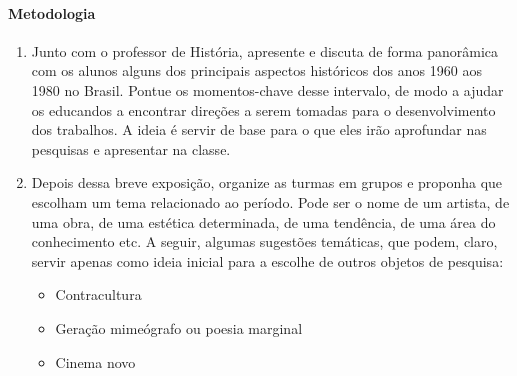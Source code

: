 \documentclass[12pt]{extarticle}
\begin{document}
\paragraph{Metodologia}

\begin{enumerate} 
\item Junto com o professor de História, apresente e discuta de forma panorâmica com os
alunos alguns dos principais aspectos históricos dos anos 1960 aos 1980
no Brasil. Pontue os momentos-chave desse intervalo, de modo a ajudar os
educandos a encontrar direções a serem tomadas para o desenvolvimento
dos trabalhos. A ideia é servir de base para o que eles irão aprofundar
nas pesquisas e apresentar na classe.



  

\item Depois dessa breve exposição, organize as turmas em grupos e proponha
que escolham um tema relacionado ao período. Pode ser o nome de um
artista, de uma obra, de uma estética determinada, de uma tendência, de
uma área do conhecimento etc. A seguir, algumas sugestões temáticas, que
podem, claro, servir apenas como ideia inicial para a escolhe de outros
objetos de pesquisa:



\begin{itemize}
\item
  Contracultura
  
\item
  Geração mimeógrafo ou poesia marginal
\item
  Cinema novo
  

\end{itemize}
\end{enumerate}
\end{document}
